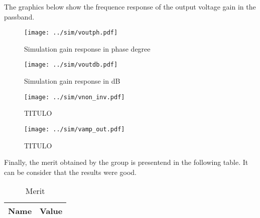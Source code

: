 \par The graphics below show the frequence response of the output voltage gain in the passband.

\begin{figure}[H] \centering
\texttt{[image: ../sim/voutph.pdf]}
\caption{Simulation gain response in phase degree}
\label{fig:ng1}
\end{figure}

\begin{figure}[H] \centering
\texttt{[image: ../sim/voutdb.pdf]}
\caption{Simulation gain response in dB}
\label{fig:ng6}
\end{figure}

\begin{figure}[H] \centering
\texttt{[image: ../sim/vnon\_inv.pdf]}
\caption{TITULO}
\label{fig:ng7}
\end{figure}

\begin{figure}[H] \centering
\texttt{[image: ../sim/vamp\_out.pdf]}
\caption{TITULO}
\label{fig:ng8}
\end{figure}

\par Finally, the merit obtained by the group is presentend in the following table. It can be consider that the results were good.

\begin{table}[!ht]
  \centering
  \begin{tabular}{|l|r|}
    \hline    
    {\bf Name} & {\bf Value} \\ \hline
    
  \end{tabular}
  \caption{Merit}
  \label{tab:ng5}
\end{table}


